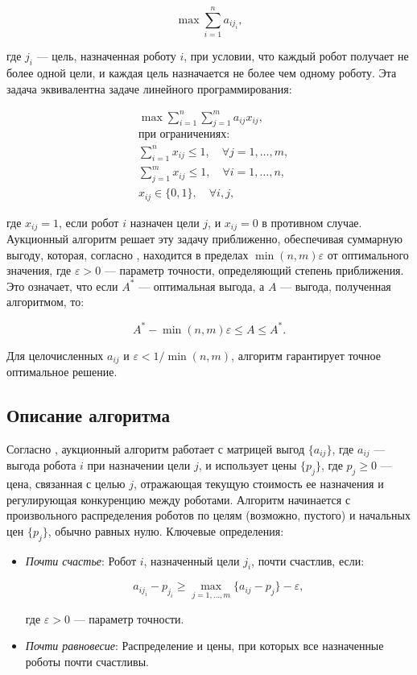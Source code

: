 \[
\max \sum_{i=1}^n a_{i j_i},
\]

где \( j_i \) --- цель, назначенная роботу \( i \), при условии, что каждый робот получает не более одной цели, и каждая цель назначается не более чем одному роботу. Эта задача эквивалентна задаче линейного программирования:

\[
\begin{aligned}
&\max \sum_{i=1}^n \sum_{j=1}^m a_{ij} x_{ij}, \\
&\text{при ограничениях:} \\
&\sum_{i=1}^n x_{ij} \leq 1, \quad \forall j = 1, \ldots, m, \\
&\sum_{j=1}^m x_{ij} \leq 1, \quad \forall i = 1, \ldots, n, \\
&x_{ij} \in \{0, 1\}, \quad \forall i, j,
\end{aligned}
\]

где \( x_{ij} = 1 \), если робот \( i \) назначен цели \( j \), и \( x_{ij} = 0 \) в противном случае. Аукционный алгоритм решает эту задачу приближенно, обеспечивая суммарную выгоду, которая, согласно \cite{bertsekas1990}, находится в пределах \( \min(n, m) \varepsilon \) от оптимального значения, где \( \varepsilon > 0 \) --- параметр точности, определяющий степень приближения. Это означает, что если \( A^* \) --- оптимальная выгода, а \( A \) --- выгода, полученная алгоритмом, то:

\[
A^* - \min(n, m) \varepsilon \leq A \leq A^*.
\]

Для целочисленных \( a_{ij} \) и \( \varepsilon < 1/\min(n, m) \), алгоритм гарантирует точное оптимальное решение.

\subsection{Описание алгоритма}
Согласно \cite{bertsekas1990}, аукционный алгоритм работает с матрицей выгод \( \{a_{ij}\} \), где \( a_{ij} \) — выгода робота \( i \) при назначении цели \( j \), и использует цены \( \{p_j\} \), где \( p_j \geq 0 \) — цена, связанная с целью \( j \), отражающая текущую стоимость ее назначения и регулирующая конкуренцию между роботами. Алгоритм начинается с произвольного распределения роботов по целям (возможно, пустого) и начальных цен \( \{p_j\} \), обычно равных нулю. Ключевые определения:

\begin{itemize}
    \item \textit{Почти счастье}: Робот \( i \), назначенный цели \( j_i \), почти счастлив, если:

    \[
    a_{i j_i} - p_{j_i} \geq \max_{j=1,\ldots,m} \{a_{ij} - p_j\} - \varepsilon,
    \]

    где \( \varepsilon > 0 \) — параметр точности.
    \item \textit{Почти равновесие}: Распределение и цены, при которых все назначенные роботы почти счастливы.
\end{itemize}


